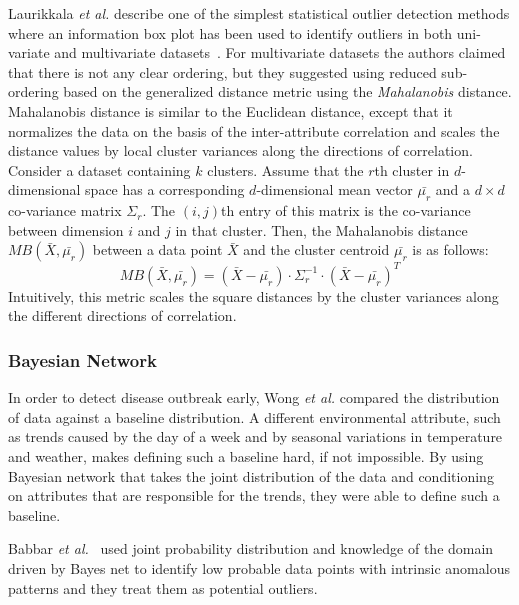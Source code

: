 Laurikkala {\em et al.} describe one of the simplest statistical outlier detection methods where an information box plot has been used to identify outliers in both uni-variate and multivariate datasets~\cite{Laurikkala00}. For multivariate datasets the authors claimed that there is not any clear ordering, but they suggested using reduced sub-ordering based on the generalized distance metric using the \textit{Mahalanobis} distance. Mahalanobis distance is similar to the Euclidean distance, except that it normalizes the data on the basis of the inter-attribute correlation and scales the distance values by local cluster variances along the directions of correlation. Consider a dataset containing $k$ clusters. Assume that the $r$th cluster in $d$-dimensional space has a corresponding $d$-dimensional mean vector $\bar{\mu_{r}}$ and a $d\times d$ co-variance matrix $\Sigma_{r}$. The $(i,j)$th entry of this matrix is the co-variance between dimension $i$ and $j$ in that cluster. Then, the Mahalanobis distance $MB(\bar{X}, \bar{\mu_{r}})$ between a data point $\bar{X}$ and the cluster centroid $\bar{\mu_{r}}$ is as follows: 
\begin{equation}
MB(\bar{X},\bar{\mu_{r}} )=(\bar{X}-\bar{\mu_{r}} )\cdot \Sigma_{r}^{-1}\cdot (\bar{X}-\bar{\mu_{r}} )^T
\end{equation}
Intuitively, this metric scales the square distances by the cluster variances along the different directions of correlation.\\
\subsubsection{Bayesian Network}
In order to detect disease outbreak early, Wong {\em et al.} \cite{Wong2003} compared the distribution of data against a baseline distribution. A different environmental attribute, such as trends caused by the day of a week and by seasonal variations in temperature and weather, makes defining such a baseline hard, if not impossible. By using Bayesian network that takes the joint distribution of the data and conditioning on attributes that are responsible for the trends, they were able to define such a baseline.

Babbar {\em et al.}~\cite{Babbar2010} used joint probability distribution and knowledge of the domain driven by Bayes net to identify low probable data points with intrinsic anomalous patterns and they treat them as potential outliers.

